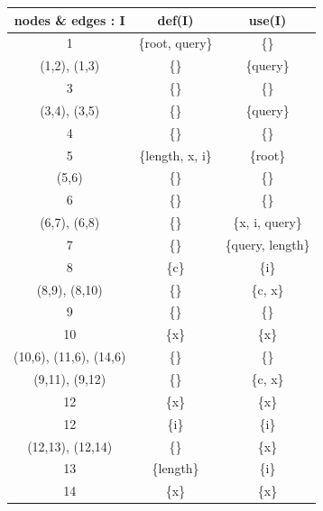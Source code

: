 \documentclass[12pt]{article}
\begin{document}
\begin{table}[htb]
\centering
\begin{tabular}{| c | c | c |} 
 \hline
 \textbf{nodes \& edges : I} & \textbf{def(I}) & \textbf{use(I)} \\ \hline
 1                      & \{root, query\} & \{\} \\ \hline
 (1,2), (1,3)           & \{\} & \{query\} \\ \hline
 3                      & \{\} & \{\} \\ \hline
 (3,4), (3,5)           & \{\} & \{query\} \\ \hline
 4                      & \{\} & \{\} \\ \hline
 5                      & \{length, x, i\} & \{root\} \\ \hline
 (5,6)                  & \{\} & \{\} \\ \hline
 6                      & \{\} & \{\} \\ \hline
 (6,7), (6,8)           & \{\} & \{x, i, query\} \\ \hline
 7                      & \{\} & \{query, length\} \\ \hline
 8                      & \{c\} & \{i\} \\ \hline
 (8,9), (8,10)          & \{\} & \{c, x\} \\ \hline
 9                      & \{\} & \{\} \\ \hline
 10                     & \{x\} & \{x\} \\ \hline
 (10,6), (11,6), (14,6) & \{\} & \{\} \\ \hline
 (9,11), (9,12)         & \{\} & \{c, x\} \\ \hline
 12                     & \{x\} & \{x\} \\ \hline
 12                     & \{i\} & \{i\} \\ \hline
 (12,13), (12,14)       & \{\} & \{x\} \\ \hline
 13                     & \{length\} & \{i\} \\ \hline
 14                     & \{x\} & \{x\} \\ \hline
\end{tabular}
\end{table}
\end{document}
